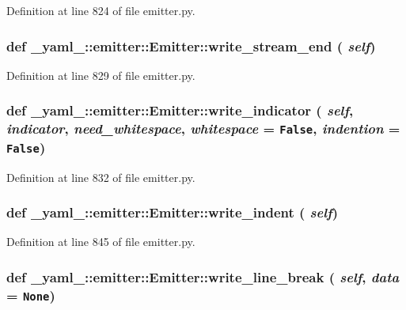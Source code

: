 Definition at line 824 of file emitter.py.
\subsubsection{\setlength{\rightskip}{0pt plus 5cm}def \_\-yaml\_\-::emitter::Emitter::write\_\-stream\_\-end ( {\em self})}\label{class__yaml___1_1emitter_1_1Emitter_bedd40e62d2486f2fc3964fc56411d34}




Definition at line 829 of file emitter.py.
\subsubsection{\setlength{\rightskip}{0pt plus 5cm}def \_\-yaml\_\-::emitter::Emitter::write\_\-indicator ( {\em self},  {\em indicator},  {\em need\_\-whitespace},  {\em whitespace} = {\tt False},  {\em indention} = {\tt False})}\label{class__yaml___1_1emitter_1_1Emitter_d3c3b1f292882e8eed51035e915b7af9}




Definition at line 832 of file emitter.py.
\subsubsection{\setlength{\rightskip}{0pt plus 5cm}def \_\-yaml\_\-::emitter::Emitter::write\_\-indent ( {\em self})}\label{class__yaml___1_1emitter_1_1Emitter_33b39ec036c2b0981a9e5fb1b2454369}




Definition at line 845 of file emitter.py.
\subsubsection{\setlength{\rightskip}{0pt plus 5cm}def \_\-yaml\_\-::emitter::Emitter::write\_\-line\_\-break ( {\em self},  {\em data} = {\tt None})}\label{class__yaml___1_1emitter_1_1Emitter_a1e28ac6ba69a6ecb9b30a119a18d0f0}




